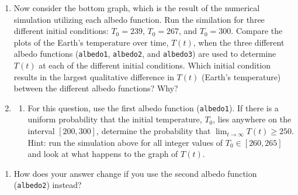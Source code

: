 \documentclass{exam}
\providecommand{\tightlist}{%
      \setlength{\itemsep}{0pt}\setlength{\parskip}{0pt}}
\begin{document}
\begin{enumerate}
\def\labelenumi{\arabic{enumi}.}
\setcounter{enumi}{1}
\item
  Now consider the bottom graph, which is the result of the numerical
  simulation utilizing each albedo function. Run the similation for
  three different initial conditions: \(T_0=239\), \(T_0=267\), and
  \(T_0=300\). Compare the plots of the Earth's temperature over time,
  \(T(t)\), when the three different albedo functions (\texttt{albedo1},
  \texttt{albedo2}, and \texttt{albedo3}) are used to determine \(T(t)\)
  at each of the different initial conditions. Which initial condition
  results in the largest qualitative difference in \(T(t)\) (Earth's
  temperature) between the different albedo functions? Why?
\item
  \begin{enumerate}
  \def\labelenumii{\alph{enumii}.}
  \tightlist
  \item
    For this question, use the first albedo function (\texttt{albedo1}).
    If there is a uniform probability that the initial temperature,
    \(T_0\), lies anywhere on the interval \([200,300]\), determine the
    probability that \(\lim_{t \to \infty}T(t) \geq 250\). Hint: run the
    simulation above for all integer values of \(T_0 \in [260,265]\) and
    look at what happens to the graph of \(T(t)\).
  \end{enumerate}
\end{enumerate}

\begin{enumerate}
\def\labelenumi{\alph{enumi}.}
\setcounter{enumi}{1}
\tightlist
\item
  How does your answer change if you use the second albedo function
  (\texttt{albedo2}) instead?
\end{enumerate}
\end{document}

